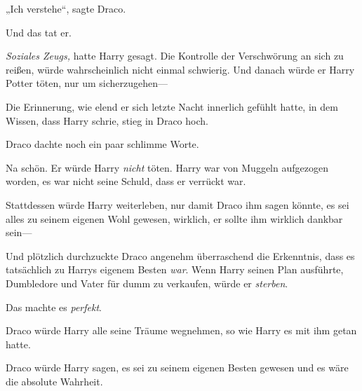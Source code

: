 „Ich verstehe“, sagte Draco.

Und das tat er.

\emph{Soziales Zeugs,} hatte Harry gesagt. Die Kontrolle der Verschwörung an sich zu reißen, würde wahrscheinlich nicht einmal schwierig. Und danach würde er Harry Potter töten, nur um sicherzugehen—

Die Erinnerung, wie elend er sich letzte Nacht innerlich gefühlt hatte, in dem Wissen, dass Harry schrie, stieg in Draco hoch.

Draco dachte noch ein paar schlimme Worte.

Na schön. Er würde Harry \emph{nicht} töten. Harry war von Muggeln aufgezogen worden, es war nicht seine Schuld, dass er verrückt war.

Stattdessen würde Harry weiterleben, nur damit Draco ihm sagen könnte, es sei alles zu seinem eigenen Wohl gewesen, wirklich, er sollte ihm wirklich dankbar sein—

Und plötzlich durchzuckte Draco angenehm überraschend die Erkenntnis, dass es tatsächlich zu Harrys eigenem Besten \emph{war}. Wenn Harry seinen Plan ausführte, Dumbledore und Vater für dumm zu verkaufen, würde er \emph{sterben}.

Das machte es \emph{perfekt}.

Draco würde Harry alle seine Träume wegnehmen, so wie Harry es mit ihm getan hatte.

Draco würde Harry sagen, es sei zu seinem eigenen Besten gewesen und es wäre die absolute Wahrheit.

